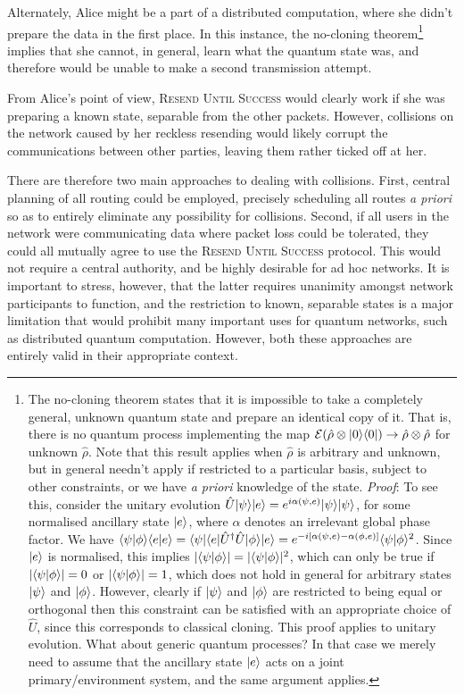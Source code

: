 Alternately, Alice might be a part of a distributed computation, where she didn't prepare the data in the first place. In this instance, the no-cloning theorem\footnote{The no-cloning theorem states that it is impossible to take a completely general, unknown quantum state and prepare an identical copy of it. That is, there is no quantum process implementing the map \mbox{$\mathcal{E}(\hat\rho\otimes|0\rangle\langle0|) \to \hat\rho\otimes\hat\rho$} for unknown $\hat\rho$. Note that this result applies when $\hat\rho$ is arbitrary and unknown, but in general needn't apply if restricted to a particular basis, subject to other constraints, or we have \textit{a priori} knowledge of the state. \textit{Proof}: To see this, consider the unitary evolution \mbox{$\hat{U}|\psi\rangle|e\rangle = e^{i\alpha(\psi,e)}|\psi\rangle|\psi\rangle$}, for some normalised ancillary state $|e\rangle$, where $\alpha$ denotes an irrelevant global phase factor. We have \mbox{$\langle\psi|\phi\rangle\langle e|e\rangle = \langle\psi|\langle e|\hat{U}^\dag\hat{U}|\phi\rangle|e\rangle = e^{-i[\alpha(\psi,e)-\alpha(\phi,e)]} \langle\psi|\phi\rangle^2$}. Since $|e\rangle$ is normalised, this implies \mbox{$|\langle\psi|\phi\rangle| = |\langle\psi|\phi\rangle|^2$}, which can only be true if \mbox{$ |\langle\psi|\phi\rangle|=0$} or \mbox{$ |\langle\psi|\phi\rangle|=1$}, which does not hold in general for arbitrary states $|\psi\rangle$ and $|\phi\rangle$. However, clearly if $|\psi\rangle$ and $|\phi\rangle$ are restricted to being equal or orthogonal then this constraint can be satisfied with an appropriate choice of $\hat{U}$, since this corresponds to classical cloning. This proof applies to unitary evolution. What about generic quantum processes? In that case we merely need to assume that the ancillary state $|e\rangle$ acts on a joint primary/environment system, and the same argument applies.} implies that she cannot, in general, learn what the quantum state was, and therefore would be unable to make a second transmission attempt.

From Alice's point of view, \textsc{Resend Until Success} would clearly work if she was preparing a known state, separable from the other packets. However, collisions on the network caused by her reckless resending would likely corrupt the communications between other parties, leaving them rather ticked off at her.

There are therefore two main approaches to dealing with collisions. First, central planning of all routing could be employed, precisely scheduling all routes \textit{a priori} so as to entirely eliminate any possibility for collisions. Second, if all users in the network were communicating data where packet loss could be tolerated, they could all mutually agree to use the \textsc{Resend Until Success} protocol. This would not require a central authority, and be highly desirable for ad hoc networks. It is important to stress, however, that the latter requires unanimity amongst network participants to function, and the restriction to known, separable states is a major limitation that would prohibit many important uses for quantum networks, such as distributed quantum computation. However, both these approaches are entirely valid in their appropriate context.

